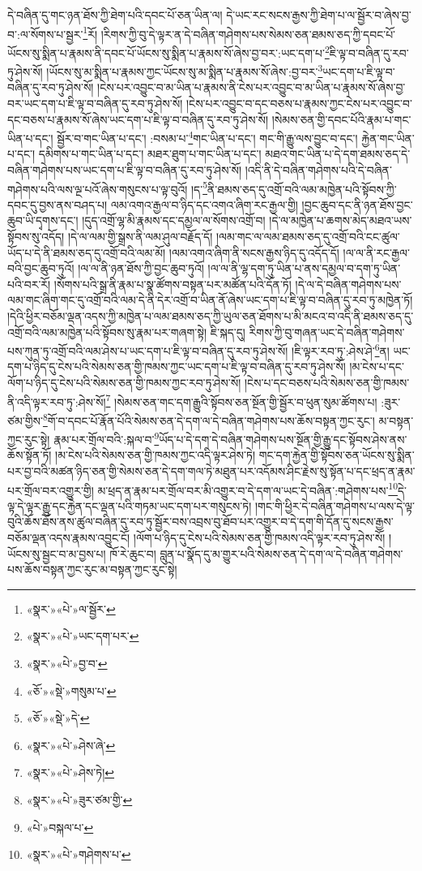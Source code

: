 དེ་བཞིན་དུ་གང་ཉན་ཐོས་ཀྱི་ཐེག་པའི་དབང་པོ་ཅན་ཡིན་ལ། དེ་ཡང་རང་སངས་རྒྱས་ཀྱི་ཐེག་པ་ལ་སྦྱོར་བ་ཞེས་བྱ་བ་:ལ་སོགས་པ་སྦྱར་\footnote{«སྣར་»«པེ་»ལ་སྦྱོར་}རོ། །རིགས་ཀྱི་བུ་དེ་ལྟར་ན་དེ་བཞིན་གཤེགས་པས་སེམས་ཅན་ཐམས་ཅད་ཀྱི་དབང་པོ་ཡོངས་སུ་སྨིན་པ་རྣམས་ནི་དབང་པོ་ཡོངས་སུ་སྨིན་པ་རྣམས་སོ་ཞེས་བྱ་བར་:ཡང་དག་པ་\footnote{«སྣར་»«པེ་»ཡང་དག་པར་}ཇི་ལྟ་བ་བཞིན་དུ་རབ་ཏུ་ཤེས་སོ། །ཡོངས་སུ་མ་སྨིན་པ་རྣམས་ཀྱང་ཡོངས་སུ་མ་སྨིན་པ་རྣམས་སོ་ཞེས་:བྱ་བར་\footnote{«སྣར་»«པེ་»བྱ་བ་}ཡང་དག་པ་ཇི་ལྟ་བ་བཞིན་དུ་རབ་ཏུ་ཤེས་སོ། །ངེས་པར་འབྱུང་བ་མ་ཡིན་པ་རྣམས་ནི་ངེས་པར་འབྱུང་བ་མ་ཡིན་པ་རྣམས་སོ་ཞེས་བྱ་བར་ཡང་དག་པ་ཇི་ལྟ་བ་བཞིན་དུ་རབ་ཏུ་ཤེས་སོ། །ངེས་པར་འབྱུང་བ་དང་བཅས་པ་རྣམས་ཀྱང་ངེས་པར་འབྱུང་བ་དང་བཅས་པ་རྣམས་སོ་ཞེས་ཡང་དག་པ་ཇི་ལྟ་བ་བཞིན་དུ་རབ་ཏུ་ཤེས་སོ། །སེམས་ཅན་གྱི་དབང་པོའི་རྣམ་པ་གང་ཡིན་པ་དང་། སྦྱོར་བ་གང་ཡིན་པ་དང་། :བསམ་པ་\footnote{«ཅོ་»«སྡེ་»གསུམ་པ་}གང་ཡིན་པ་དང་། གང་གི་རྒྱུ་ལས་བྱུང་བ་དང་། རྐྱེན་གང་ཡིན་པ་དང་། དམིགས་པ་གང་ཡིན་པ་དང་། མཐར་ཐུག་པ་གང་ཡིན་པ་དང་། མཐའ་གང་ཡིན་པ་དེ་དག་ཐམས་ཅད་དེ་བཞིན་གཤེགས་པས་ཡང་དག་པ་ཇི་ལྟ་བ་བཞིན་དུ་རབ་ཏུ་ཤེས་སོ། །འདི་ནི་དེ་བཞིན་གཤེགས་པའི་དེ་བཞིན་གཤེགས་པའི་ལས་ལྔ་པའོ་ཞེས་གསུངས་པ་ལྟ་བུའོ། །ད་\footnote{«ཅོ་»«སྡེ་»དེ་}ནི་ཐམས་ཅད་དུ་འགྲོ་བའི་ལམ་མཁྱེན་པའི་སྟོབས་ཀྱི་དབང་དུ་བྱས་ནས་བཤད་པ། ལམ་འགའ་རྒྱལ་བ་ཉིད་དང་འགའ་ཞིག་རང་རྒྱལ་གྱི། །བྱང་ཆུབ་དང་ནི་ཉན་ཐོས་བྱང་ཆུབ་ཡི་དྭགས་དང་། །དུད་འགྲོ་ལྷ་མི་རྣམས་དང་དམྱལ་ལ་སོགས་འགྲོ་བ། །དེ་ལ་མཁྱེན་པ་ཆགས་མེད་མཐའ་ཡས་སྟོབས་སུ་འདོད། །དེ་ལ་ལམ་གྱི་སྒྲས་ནི་ལམ་ཤུལ་བརྗོད་དོ། །ལམ་གང་ལ་ལམ་ཐམས་ཅད་དུ་འགྲོ་བའི་ངང་ཚུལ་ཡོད་པ་དེ་ནི་ཐམས་ཅད་དུ་འགྲོ་བའི་ལམ་མོ། །ལམ་འགའ་ཞིག་ནི་སངས་རྒྱས་ཉིད་དུ་འདོད་དོ། །ལ་ལ་ནི་རང་རྒྱལ་བའི་བྱང་ཆུབ་ཏུའོ། །ལ་ལ་ནི་ཉན་ཐོས་ཀྱི་བྱང་ཆུབ་ཏུའོ། །ལ་ལ་ནི་ལྷ་དག་ཏུ་ཡིན་པ་ནས་དམྱལ་བ་དག་ཏུ་ཡིན་པའི་བར་རོ། །སོགས་པའི་སྒྲ་ནི་རྣམ་པ་སྣ་ཚོགས་བསྟན་པར་མཚོན་པའི་དོན་ཏོ། །དེ་ལ་དེ་བཞིན་གཤེགས་པས་ལམ་གང་ཞིག་གང་དུ་འགྲོ་བའི་ལམ་དེ་ནི་དེར་འགྲོ་བ་ཡིན་ནོ་ཞེས་ཡང་དག་པ་ཇི་ལྟ་བ་བཞིན་དུ་རབ་ཏུ་མཁྱེན་ཏོ། །དེའི་ཕྱིར་བཅོམ་ལྡན་འདས་ཀྱི་མཁྱེན་པ་ལམ་ཐམས་ཅད་ཀྱི་ཡུལ་ཅན་ཐོགས་པ་མི་མངའ་བ་འདི་ནི་ཐམས་ཅད་དུ་འགྲོ་བའི་ལམ་མཁྱེན་པའི་སྟོབས་སུ་རྣམ་པར་གཞག་སྟེ། ཇི་སྐད་དུ། རིགས་ཀྱི་བུ་གཞན་ཡང་དེ་བཞིན་གཤེགས་པས་ཀུན་ཏུ་འགྲོ་བའི་ལམ་ཤེས་པ་ཡང་དག་པ་ཇི་ལྟ་བ་བཞིན་དུ་རབ་ཏུ་ཤེས་སོ། །ཇི་ལྟར་རབ་ཏུ་:ཤེས་ཤེ་\footnote{«སྣར་»«པེ་»ཤེས་ཞེ་}ན། ཡང་དག་པ་ཉིད་དུ་ངེས་པའི་སེམས་ཅན་གྱི་ཁམས་ཀྱང་ཡང་དག་པ་ཇི་ལྟ་བ་བཞིན་དུ་རབ་ཏུ་ཤེས་སོ། །མ་ངེས་པ་དང་ལོག་པ་ཉིད་དུ་ངེས་པའི་སེམས་ཅན་གྱི་ཁམས་ཀྱང་རབ་ཏུ་ཤེས་སོ། །ངེས་པ་དང་བཅས་པའི་སེམས་ཅན་གྱི་ཁམས་ནི་འདི་ལྟར་རབ་ཏུ་:ཤེས་སོ།\footnote{«སྣར་»«པེ་»ཤེས་ཏེ།} །སེམས་ཅན་གང་དག་རྒྱུའི་སྟོབས་ཅན་སྔོན་གྱི་སྦྱོར་བ་ཕུན་སུམ་ཚོགས་པ། :ཟུར་ཙམ་གྱིས་\footnote{«སྣར་»«པེ་»ཟུར་ཙམ་གྱི་}གོ་བ་དབང་པོ་རྣོན་པོའི་སེམས་ཅན་དེ་དག་ལ་དེ་བཞིན་གཤེགས་པས་ཆོས་བསྟན་ཀྱང་རུང་། མ་བསྟན་ཀྱང་རུང་སྟེ། རྣམ་པར་གྲོལ་བའི་:སྐལ་བ་\footnote{«པེ་»བསྐལ་པ་}ཡོད་པ་དེ་དག་དེ་བཞིན་གཤེགས་པས་སྔོན་གྱི་རྒྱུ་དང་སྟོབས་ཤེས་ནས་ཆོས་སྟོན་ཏོ། །མ་ངེས་པའི་སེམས་ཅན་གྱི་ཁམས་ཀྱང་འདི་ལྟར་ཤེས་ཏེ། གང་དག་རྐྱེན་གྱི་སྟོབས་ཅན་ཡོངས་སུ་སྨིན་པར་བྱ་བའི་མཚན་ཉིད་ཅན་གྱི་སེམས་ཅན་དེ་དག་གལ་ཏེ་མཐུན་པར་འདོམས་ཤིང་རྗེས་སུ་སྟོན་པ་དང་ཕྲད་ན་རྣམ་པར་གྲོལ་བར་འགྱུར་གྱི། མ་ཕྲད་ན་རྣམ་པར་གྲོལ་བར་མི་འགྱུར་བ་དེ་དག་ལ་ཡང་དེ་བཞིན་:གཤེགས་པས་\footnote{«སྣར་»«པེ་»གཤེགས་པ་}དེ་ལྟ་དེ་ལྟར་རྒྱུ་དང་རྐྱེན་དང་ལྡན་པའི་གཏམ་ཡང་དག་པར་གསུངས་ཏེ། །གང་གི་ཕྱིར་དེ་བཞིན་གཤེགས་པ་ལས་དེ་ལྟ་བུའི་ཆོས་ཐོས་ནས་ཚུལ་བཞིན་དུ་རབ་ཏུ་སྦྱོར་བས་འབྲས་བུ་ཐོབ་པར་འགྱུར་བ་དེ་དག་གི་དོན་དུ་སངས་རྒྱས་བཅོམ་ལྡན་འདས་རྣམས་འབྱུང་ངོ། །ལོག་པ་ཉིད་དུ་ངེས་པའི་སེམས་ཅན་གྱི་ཁམས་འདི་ལྟར་རབ་ཏུ་ཤེས་སོ། །ཡོངས་སུ་སྦྱང་བ་མ་བྱས་པ། ཁོ་རེ་ཆུང་བ། བླུན་པ་སྣོད་དུ་མ་གྱུར་པའི་སེམས་ཅན་དེ་དག་ལ་དེ་བཞིན་གཤེགས་པས་ཆོས་བསྟན་ཀྱང་རུང་མ་བསྟན་ཀྱང་རུང་སྟེ། 